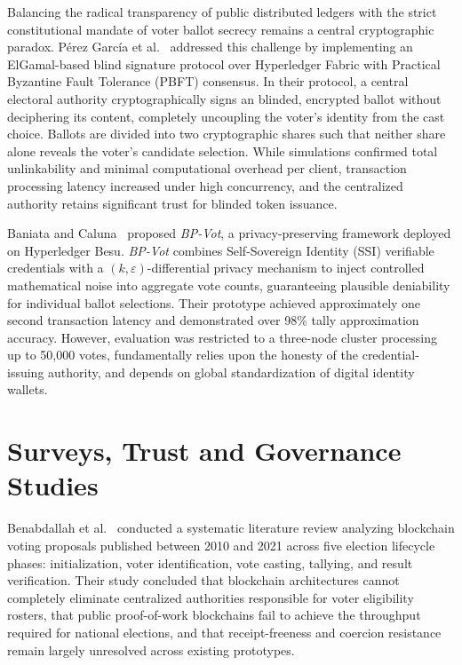 \documentclass[12pt,a4paper]{report}
\begin{document}
Balancing the radical transparency of public distributed ledgers with the strict constitutional mandate of voter ballot secrecy remains a central cryptographic paradox. Pérez García et al.~\cite{PerezGarcia2021} addressed this challenge by implementing an ElGamal-based blind signature protocol over Hyperledger Fabric with Practical Byzantine Fault Tolerance (PBFT) consensus. In their protocol, a central electoral authority cryptographically signs an blinded, encrypted ballot without deciphering its content, completely uncoupling the voter's identity from the cast choice. Ballots are divided into two cryptographic shares such that neither share alone reveals the voter's candidate selection. While simulations confirmed total unlinkability and minimal computational overhead per client, transaction processing latency increased under high concurrency, and the centralized authority retains significant trust for blinded token issuance.

Baniata and Caluna~\cite{Baniata2025} proposed \textit{BP-Vot}, a privacy-preserving framework deployed on Hyperledger Besu. \textit{BP-Vot} combines Self-Sovereign Identity (SSI) verifiable credentials with a $(k, \varepsilon)$-differential privacy mechanism to inject controlled mathematical noise into aggregate vote counts, guaranteeing plausible deniability for individual ballot selections. Their prototype achieved approximately one second transaction latency and demonstrated over 98\% tally approximation accuracy. However, evaluation was restricted to a three-node cluster processing up to 50,000 votes, fundamentally relies upon the honesty of the credential-issuing authority, and depends on global standardization of digital identity wallets.

\section{Surveys, Trust and Governance Studies}
Benabdallah et al.~\cite{Benabdallah2022} conducted a systematic literature review analyzing blockchain voting proposals published between 2010 and 2021 across five election lifecycle phases: initialization, voter identification, vote casting, tallying, and result verification. Their study concluded that blockchain architectures cannot completely eliminate centralized authorities responsible for voter eligibility rosters, that public proof-of-work blockchains fail to achieve the throughput required for national elections, and that receipt-freeness and coercion resistance remain largely unresolved across existing prototypes.
\end{document}
